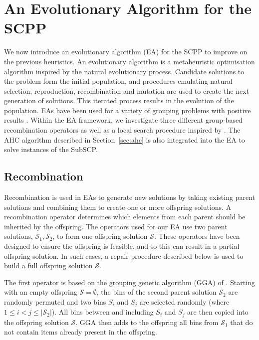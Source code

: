 \documentclass[authoryear]{elsarticle}
\begin{document}
\section{An Evolutionary Algorithm for the SCPP}
\label{sec:ea}
\noindent We now introduce an evolutionary algorithm (EA) for the SCPP to improve on the previous heuristics. An evolutionary algorithm is a metaheuristic optimisation algorithm inspired by the natural evolutionary process. Candidate solutions to the problem form the initial population, and procedures emulating natural selection, reproduction, recombination and mutation are used to create the next generation of solutions. This iterated process results in the evolution of the population. EAs have been used for a variety of grouping problems with positive results \citep{lewis2017, falkenauer1996, quiroz2015}. Within the EA framework, we investigate three different group-based recombination operators as well as a local search procedure inspired by \citet{martello1990l}. The AHC algorithm described in Section~\ref{sec:ahc} is also integrated into the EA to solve instances of the SubSCP.

\subsection{Recombination}
\label{sub:recomb}
\noindent Recombination is used in EAs to generate new solutions by taking existing parent solutions and combining them to create one or more offspring solutions. A recombination operator determines which elements from each parent should be inherited by the offspring. The operators used for our EA use two parent solutions, $\mathcal{S}_1, \mathcal{S}_2$, to form one offspring solution $\mathcal{S}$. These operators have been designed to ensure the offspring is feasible, and so this can result in a partial offspring solution. In such cases, a repair procedure described below is used to build a full offspring solution $\mathcal{S}$.


The first operator is based on the grouping genetic algorithm (GGA) of \citet{falkenauer1992}. Starting with an empty offspring $\mathcal{S} = \emptyset$, the bins of the second parent solution $\mathcal{S}_2$ are randomly permuted and two bins $S_i$ and $S_j$ are selected randomly (where $1 \leq i < j \leq |\mathcal{S}_2|$). All bins between and including $S_i$ and $S_j$ are then copied into the offspring solution $\mathcal{S}$. GGA then adds to the offspring all bins from $\mathcal{S}_1$ that do not contain items already present in the offspring.
\end{document}
